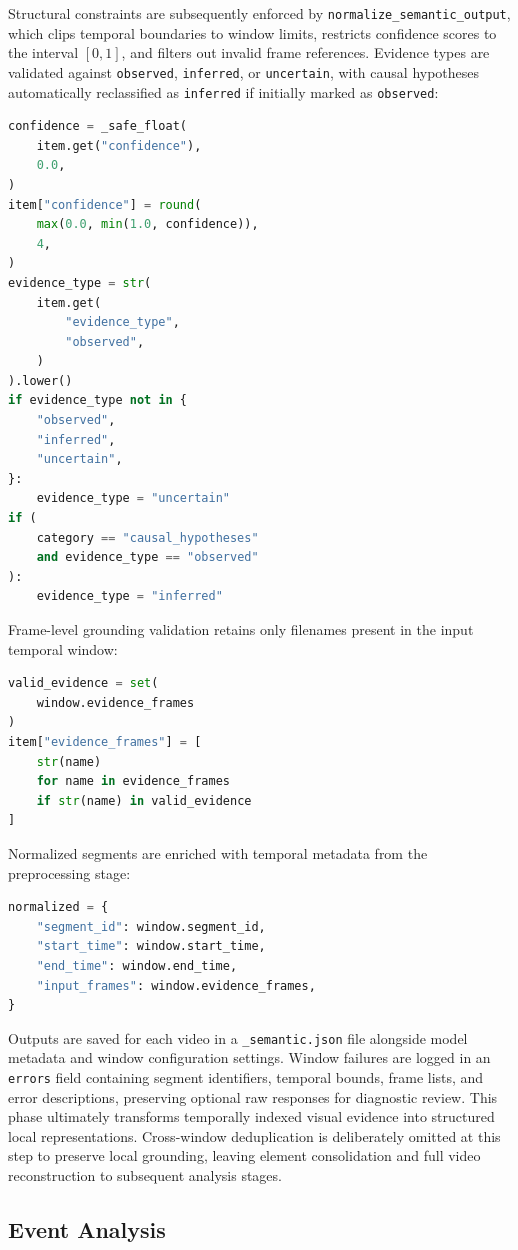 Structural constraints are subsequently enforced by \texttt{normalize\_semantic\_output}, which clips temporal boundaries to window limits, restricts confidence scores to the interval $[0,1]$, and filters out invalid frame references. Evidence types are validated against \texttt{observed}, \texttt{inferred}, or \texttt{uncertain}, with causal hypotheses automatically reclassified as \texttt{inferred} if initially marked as \texttt{observed}:
\begin{lstlisting}[language=Python]
confidence = _safe_float(
    item.get("confidence"),
    0.0,
)
item["confidence"] = round(
    max(0.0, min(1.0, confidence)),
    4,
)
evidence_type = str(
    item.get(
        "evidence_type",
        "observed",
    )
).lower()
if evidence_type not in {
    "observed",
    "inferred",
    "uncertain",
}:
    evidence_type = "uncertain"
if (
    category == "causal_hypotheses"
    and evidence_type == "observed"
):
    evidence_type = "inferred"
\end{lstlisting}
Frame-level grounding validation retains only filenames present in the input temporal window:
\begin{lstlisting}[language=Python]
valid_evidence = set(
    window.evidence_frames
)
item["evidence_frames"] = [
    str(name)
    for name in evidence_frames
    if str(name) in valid_evidence
]
\end{lstlisting}
Normalized segments are enriched with temporal metadata from the preprocessing stage:
\begin{lstlisting}[language=Python]
normalized = {
    "segment_id": window.segment_id,
    "start_time": window.start_time,
    "end_time": window.end_time,
    "input_frames": window.evidence_frames,
}
\end{lstlisting}
Outputs are saved for each video in a \texttt{\_semantic.json} file alongside model metadata and window configuration settings. Window failures are logged in an \texttt{errors} field containing segment identifiers, temporal bounds, frame lists, and error descriptions, preserving optional raw responses for diagnostic review.
This phase ultimately transforms temporally indexed visual evidence into structured local representations. Cross-window deduplication is deliberately omitted at this step to preserve local grounding, leaving element consolidation and full video reconstruction to subsequent analysis stages.
\subsection*{Event Analysis}

